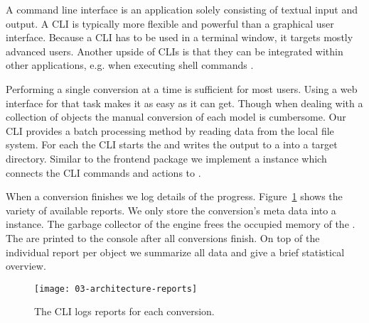 \documentclass[../../ClassicThesis.tex]{subfiles}
\begin{document}
A command line interface is an application solely consisting of
textual input and output. A CLI is typically more flexible and
powerful than a graphical user interface. Because a CLI has to be used
in a terminal window, it targets mostly advanced users. Another upside
of CLIs is that they can be integrated within other applications,
e.g. when executing shell commands \cite{cli}.

Performing a single conversion at a time is sufficient for most
users. Using a web interface for that task makes it as easy as it can
get. Though when dealing with a collection of objects the manual
conversion of each model is cumbersome. Our CLI provides a batch
processing method by reading data from the local file system. For each
{\stlfile} the CLI starts the  and writes the
output to a {\zipfile} into a target directory. Similar to the
frontend package we implement a  instance which
connects the CLI commands and actions to {\convertify}.

When a conversion finishes we log details of the progress.
Figure~\ref{fig:reports} shows the variety of available
reports. We only store the conversion's meta data into a
 instance. The garbage collector of the
{\javascript} engine frees the occupied memory of the
{\threedmodel}. The  are printed to the
console after all conversions finish. On top of the
individual report per object we summarize all data and give
a brief statistical overview.

\begin{figure}
  \centering
  \texttt{[image: 03-architecture-reports]}
  \caption{The CLI logs reports for each conversion.}
  \label{fig:reports}
\end{figure}











\end{document}
